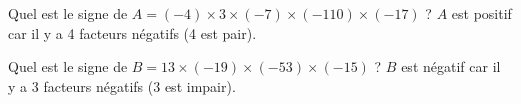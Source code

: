 \begin{exemple*1}
  Quel est le signe de $A=(-4)\times3\times(-7)\times(-110)\times(-17)$ ?
  \correction
  $A$ est positif car il y a 4 facteurs négatifs (4 est pair).
\end{exemple*1}

\begin{exemple*1}
  Quel est le signe de $B=13\times(-19)\times(-53)\times(-15)$ ?
  \correction
  $B$ est n\'egatif car il y a 3 facteurs négatifs (3 est impair).
\end{exemple*1}